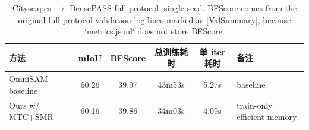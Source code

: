 \begin{table}[t]
  \centering
  \caption{Cityscapes $\rightarrow$ DensePASS full protocol, single seed. BFScore comes from the original full-protocol validation log lines marked as [ValSummary], because `metrics.jsonl` does not store BFScore.}
  \label{tab:main_results}
  \begin{tabular}{lccccl}
    \toprule
    方法 & mIoU & BFScore & 总训练耗时 & 单 iter 耗时 & 备注 \\
    \midrule
    OmniSAM baseline & 60.26 & 39.97 & 43m53s & 5.27s & baseline \\
    Ours w/ MTC+SMR & 60.16 & 39.86 & 34m03s & 4.09s & train-only efficient memory \\
    \bottomrule
  \end{tabular}
\end{table}
